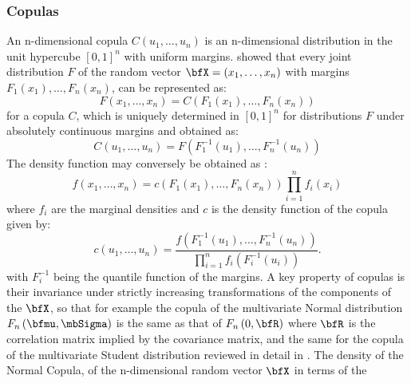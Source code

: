 \subsubsection{Copulas}\label{copulas}
An n-dimensional copula $C\left( {{u_1},\dots,{u_n}} \right)$ is an n-dimensional
distribution in the unit hypercube ${\left[ {0,1} \right]^n}$ with uniform margins.
\cite{Sklar1959} showed that every joint distribution $F$ of the random vector
$\bfX=(x_1,\dots,x_n)$ with margins ${{F_1}\left( {{x_1}} \right),\dots,{F_n}\left( {{x_n}} \right)}$,
can be represented as:
\begin{equation}\label{eq:copula1}
F\left( {{x_1},\dots,{x_n}} \right) = C\left( {{F_1}\left( {{x_1}} \right),\dots,{F_n}\left( {{x_n}} \right)} \right)
\end{equation}
for a copula $C$, which is uniquely determined in ${\left[ {0,1} \right]^n}$
for distributions $F$ under absolutely continuous margins and obtained as:
\begin{equation}\label{eq:copula2}
C\left( {{u_1},\dots,{u_n}} \right) = F\left( {F_1^{ - 1}\left( {{u_1}} \right),\dots,F_n^{ - 1}\left( {{u_n}} \right)} \right)
\end{equation}
The density function may conversely be obtained as :
\begin{equation}\label{eq:copula3}
f\left( {{x_1},\dots,{x_n}} \right) = c\left( {{F_1}\left( {{x_1}} \right),\dots,{F_n}\left( {{x_n}} \right)} \right)\prod\limits_{i = 1}^n {{f_i}\left( {{x_i}} \right)}
\end{equation}
where $f_i$ are the marginal densities and $c$ is the density function of the
copula given by:
\begin{equation}\label{eq:copula4}
c\left( {{u_1},\dots,{u_n}} \right) = \frac{{f\left( {F_1^{ - 1}\left( {{u_1}} \right),\dots,F_n^{ - 1}\left( {{u_n}} \right)} \right)}}
{{\prod\limits_{i = 1}^n {{f_i}\left( {F_i^{ - 1}\left( {{u_i}} \right)} \right)} }}.
\end{equation}
with $F_i^{ - 1}$ being the quantile function of the margins. A key property of
copulas is their invariance under strictly increasing transformations of the
components of the $\bfX$, so that for example the copula of the multivariate
Normal distribution $F_n\left( {\bfmu ,\mbSigma } \right)$ is the same as
that of $F_n\left( {0,\bfR} \right)$ where $\bfR$ is the correlation matrix
implied by the covariance matrix, and the same for the copula of the multivariate
Student distribution reviewed in detail in \cite{Demarta2005}. The density
of the Normal Copula, of the n-dimensional random vector $\bfX$ in terms of the
